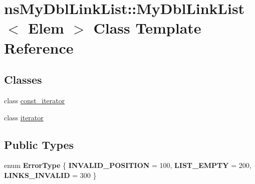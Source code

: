 \hypertarget{classnsMyDblLinkList_1_1MyDblLinkList}{\section{ns\-My\-Dbl\-Link\-List\-:\-:My\-Dbl\-Link\-List$<$ Elem $>$ Class Template Reference}
\label{classnsMyDblLinkList_1_1MyDblLinkList}
}
\subsection*{Classes}
\begin{DoxyCompactItemize}
\item 
class \hyperlink{classnsMyDblLinkList_1_1MyDblLinkList_1_1const__iterator}{const\-\_\-iterator}
\item 
class \hyperlink{classnsMyDblLinkList_1_1MyDblLinkList_1_1iterator}{iterator}
\end{DoxyCompactItemize}
\subsection*{Public Types}
\begin{DoxyCompactItemize}
\item 
enum {\bfseries Error\-Type} \{ {\bfseries I\-N\-V\-A\-L\-I\-D\-\_\-\-P\-O\-S\-I\-T\-I\-O\-N} = 100, 
{\bfseries L\-I\-S\-T\-\_\-\-E\-M\-P\-T\-Y} = 200, 
{\bfseries L\-I\-N\-K\-S\-\_\-\-I\-N\-V\-A\-L\-I\-D} = 300
 \}
\end{DoxyCompactItemize}
